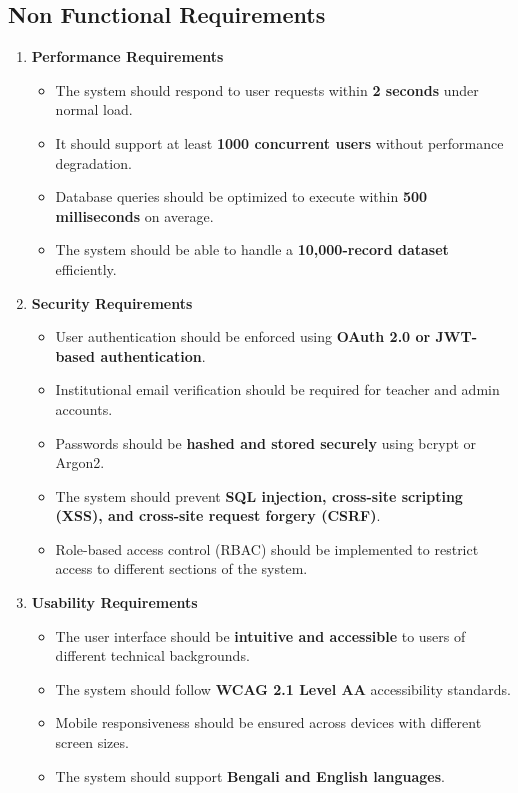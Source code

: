 \documentclass[11pt]{article}
\begin{document}
\subsection{Non Functional Requirements}
\begin{enumerate}
    \item \textbf{Performance Requirements}
    \begin{itemize}
        \item The system should respond to user requests within \textbf{2 seconds} under normal load.
        \item It should support at least \textbf{1000 concurrent users} without performance degradation.
        \item Database queries should be optimized to execute within \textbf{500 milliseconds} on average.
        \item The system should be able to handle a \textbf{10,000-record dataset} efficiently.
    \end{itemize}

    \item \textbf{Security Requirements}
    \begin{itemize}
        \item User authentication should be enforced using \textbf{OAuth 2.0 or JWT-based authentication}.
        \item Institutional email verification should be required for teacher and admin accounts.
        \item Passwords should be \textbf{hashed and stored securely} using bcrypt or Argon2.
        \item The system should prevent \textbf{SQL injection, cross-site scripting (XSS), and cross-site request forgery (CSRF)}.
        \item Role-based access control (RBAC) should be implemented to restrict access to different sections of the system.
    \end{itemize}

    \item \textbf{Usability Requirements}
    \begin{itemize}
        \item The user interface should be \textbf{intuitive and accessible} to users of different technical backgrounds.
        \item The system should follow \textbf{WCAG 2.1 Level AA} accessibility standards.
        \item Mobile responsiveness should be ensured across devices with different screen sizes.
        \item The system should support \textbf{Bengali and English languages}.
    \end{itemize}


\end{enumerate}
\end{document}
